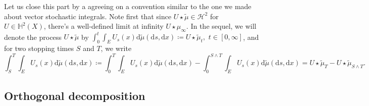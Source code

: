 \documentclass[10pt]{article} %
\newcommand\cH{\mathcal H}
\def \H{\mathbb{H}}
\def\d{\mathrm{d}}
\begin{document}
\medskip
Let us close this part by a agreeing on a convention similar to the one we made about vector stochastic integrals. Note first that since $U \star \tilde \mu \in \cH^2$ for $U \in \H^2(X)$, there's a well-defined limit at infinity $U \star \mu_\infty$. In the sequel, we will denote the process $U \star\tilde\mu$ by $\int_0^t \int_{E} U_s(x) \d \tilde\mu(\d s, \d x) \coloneqq U \star \tilde\mu_t,$ $t \in [0,\infty]$, and for two stopping times $S$ and $T$, we write
\begin{equation*}
	\int_S^T \int_{E} U_s(x) \d \tilde\mu(\d s, \d x) \coloneqq \int_0^T \int_{E} U_s(x) \d \tilde\mu(\d s, \d x) - \int_0^{S \land T} \int_{E} U_s(x) \d \tilde\mu(\d s, \d x) = U\star\tilde\mu_T - U\star\tilde\mu_{S \land T}.
\end{equation*}

\subsection{Orthogonal decomposition}
\end{document}
